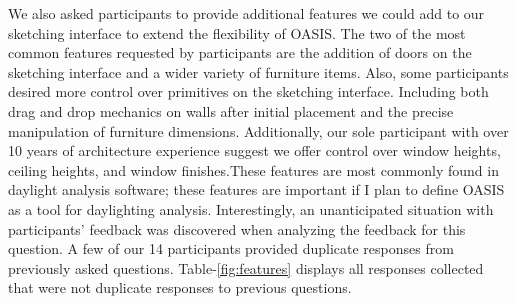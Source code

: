 We also asked participants to provide additional features we could add to our sketching interface to extend the flexibility of OASIS.
The two of the most common features requested by participants are the addition of doors on the sketching interface and a wider variety of furniture items.
Also, some participants desired more control over primitives on the sketching interface. 
Including both drag and drop mechanics on walls after initial placement and the precise manipulation of furniture dimensions.
Additionally, our sole participant with over 10 years of architecture experience suggest we offer control over window heights, ceiling heights, and window finishes.These features are most commonly found in daylight analysis software; these features are  important if I plan to define OASIS as a tool for daylighting analysis.
Interestingly, an unanticipated situation with participants' feedback was discovered when analyzing the feedback for this question.
A few of our 14 participants provided duplicate responses from previously asked questions.
Table-\ref{fig:features} displays all responses collected that were not duplicate responses to previous questions. 

